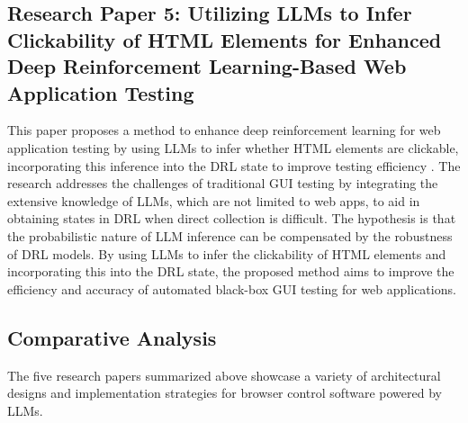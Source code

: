\documentclass[conference]{IEEEtran}
\begin{document}
\subsection{Research Paper 5: Utilizing LLMs to Infer Clickability of HTML Elements for Enhanced Deep Reinforcement Learning-Based Web Application Testing}
This paper proposes a method to enhance deep reinforcement learning for web application testing by using LLMs to infer whether HTML elements are clickable, incorporating this inference into the DRL state to improve testing efficiency \cite{clickability2025}. The research addresses the challenges of traditional GUI testing by integrating the extensive knowledge of LLMs, which are not limited to web apps, to aid in obtaining states in DRL when direct collection is difficult. The hypothesis is that the probabilistic nature of LLM inference can be compensated by the robustness of DRL models. By using LLMs to infer the clickability of HTML elements and incorporating this into the DRL state, the proposed method aims to improve the efficiency and accuracy of automated black-box GUI testing for web applications.

\subsection{Comparative Analysis}
The five research papers summarized above showcase a variety of architectural designs and implementation strategies for browser control software powered by LLMs.
\end{document}
